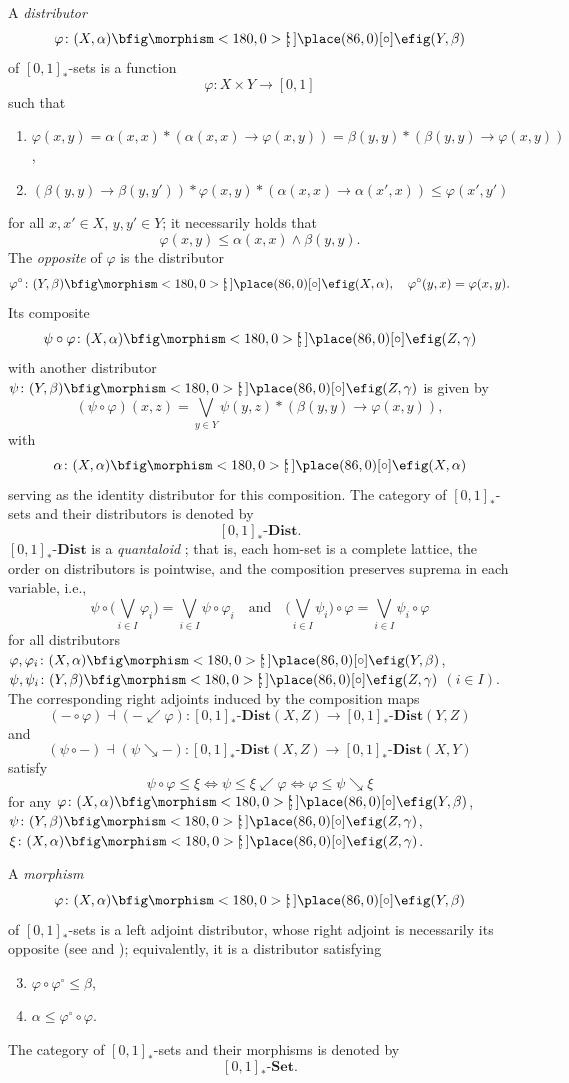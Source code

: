 \documentclass{birkau}
\theoremstyle{plain}
\theoremstyle{definition}
\def\oto{{\bfig\morphism<180,0>[\mkern-4mu`\mkern-4mu;]\place(86,0)[\circ]\efig}}
\newcommand{\ra}{\rightarrow}
\newcommand{\lda}{\swarrow}
\newcommand{\rda}{\searrow}
\newcommand{\bv}{\bigvee}
\renewcommand{\phi}{\varphi}
\newcommand{\al}{\alpha}
\newcommand{\be}{\beta}
\newcommand{\ga}{\gamma}
\newcommand{\Set}{\mathbf{Set}}
\newcommand{\RSet}{[0,1]_*\text{-}\Set}
\newcommand{\RDist}{[0,1]_*\text{-}\mathbf{Dist}}
\renewcommand{\leq}{\leqslant}
\numberwithin{equation}{section}
\begin{document}
A \emph{distributor} 
\[\phi\colon (X,\al)\oto (Y,\be)\]
of $[0,1]_*$-sets is a function
\[\phi\colon X\times Y\to[0,1]\]
such that
\begin{enumerate}[label=(M\arabic*)]
\item \label{M1} $\phi(x,y)=\al(x,x)*(\al(x,x)\ra\phi(x,y))=\be(y,y)*(\be(y,y)\ra\phi(x,y))$,
\item \label{M2} $(\be(y,y)\ra\be(y,y'))*\phi(x,y)*(\al(x,x)\ra\al(x',x))\leq\phi(x',y')$
\end{enumerate}
for all $x,x'\in X$, $y,y'\in Y$; it necessarily holds that
\begin{equation}\label{phi(x,y) leq al(x,x) wedge be(y,y)}
\phi(x,y)\leq\al(x,x)\wedge\be(y,y).
\end{equation}
The \emph{opposite} of $\phi$ is the distributor
\[\phi^{\circ}\colon(Y,\be)\oto(X,\al),\quad \phi^{\circ}(y,x)=\phi(x,y).\]
Its composite
\[\psi\circ\phi\colon(X,\al)\oto(Z,\ga)\]
with another distributor $\psi\colon(Y,\be)\oto(Z,\ga)$ is given by
\begin{equation} \label{psi-circ-phi-def}
(\psi\circ\phi)(x,z)=\bv_{y\in Y}\psi(y,z)*(\be(y,y)\ra\phi(x,y)),
\end{equation}
with
\begin{equation} \label{al-id}
\al\colon(X,\al)\oto(X,\al)
\end{equation}
serving as the identity distributor for this composition. The category of $[0,1]_*$-sets and their distributors is denoted by
\[\RDist.\]
$\RDist$ is a \emph{quantaloid} \cite{Rosenthal1996,Stubbe2005}; that is, each hom-set is a complete lattice, the order on distributors is pointwise, and the composition preserves suprema in each variable, i.e.,
\[\psi\circ\Big(\bigvee_{i\in I} \phi_i\Big)=\bigvee_{i\in I}\psi\circ \phi_i\quad\text{and}\quad\Big(\bigvee_{i\in I}\psi_i\Big)\circ \phi=\bigvee_{i\in I}\psi_i\circ \phi\]
for all distributors $\phi,\phi_i\colon (X,\al)\oto(Y,\be)$, $\psi,\psi_i\colon(Y,\be)\oto (Z,\ga)$ $(i\in I)$. The corresponding right adjoints induced by the composition maps
\[(-\circ \phi)\dashv(-\lda \phi)\colon\RDist(X,Z)\to\RDist(Y,Z)\]
and
\[(\psi\circ -)\dashv(\psi\rda -)\colon\RDist(X,Z)\to\RDist(X,Y)\]
satisfy
\[\psi\circ \phi\leq\xi\iff \psi\leq\xi\lda \phi\iff \phi\leq \psi\rda\xi\]
for any $\phi\colon (X,\al)\oto (Y,\be)$, $\psi\colon (Y,\be)\oto (Z,\gamma)$, $\xi\colon (X,\al)\oto (Z,\gamma)$. 

A \emph{morphism} 
\[\phi\colon(X,\al)\oto(Y,\be)\] 
of $[0,1]_*$-sets is a left adjoint distributor, whose right adjoint is necessarily its opposite (see \cite[Proposition 3.5.3]{Heymans2010} and \cite[Theorem 3.7]{Heymans2011}); equivalently, it is a distributor satisfying
\begin{enumerate}[label=(M\arabic*)]
\setcounter{enumi}{2}
\item \label{M3} $\phi\circ\phi^{\circ}\leq\be$,
\item \label{M4} $\al\leq\phi^{\circ}\circ\phi$.
\end{enumerate}
The category of $[0,1]_*$-sets and their morphisms is denoted by
\[\RSet.\]
\end{document}
